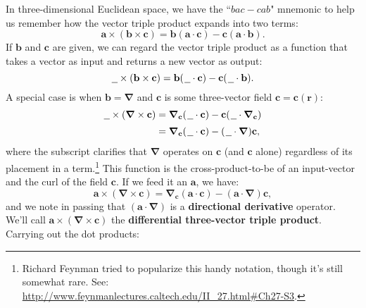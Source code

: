 \documentclass[12pt]{article}
\renewcommand{\vv}[1]{\mathbf{#1}}
\newcommand{\del}{\boldsymbol{\nabla}}
\begin{document}
In three-dimensional Euclidean space, we have the ``$bac - cab$" mnemonic to help us remember how the vector triple product expands into two terms:
\begin{equation*}
\vv a \times (\vv b \times \vv c) = \vv b (\vv a \cdot \vv c) - \vv c (\vv a \cdot \vv b).
\end{equation*}
If $\vv b$ and $\vv c$ are given, we can regard the vector triple product as a function that takes a vector as input and returns a new vector as output:
\begin{equation*}
\text{\underline{\hspace{.6em}}} \times (\vv b \times \vv c) = \vv b ( \mkern1.5mu \text{\underline{\hspace{.6em}}} \cdot \vv c ) - \vv c ( \mkern1.5mu \text{\underline{\hspace{.6em}}} \cdot \vv b ).
\end{equation*}
A special case is when $\vv b = \del$ and $\vv c$ is some three-vector field $\vv c = \vv c (\vv r)$:
\begin{equation}\label{eq:cc}
\begin{split}
\text{\underline{\hspace{.6em}}} \times (\del \times \vv c) &= \del_{\vv c} ( \mkern1.5mu \text{\underline{\hspace{.6em}}} \cdot \vv c ) - \vv c ( \mkern1.5mu \text{\underline{\hspace{.6em}}} \cdot \del_{\vv c} ) \\[2pt]
&= \del_{\vv c} ( \mkern1.5mu \text{\underline{\hspace{.6em}}} \cdot \vv c ) - ( \mkern1.5mu \text{\underline{\hspace{.6em}}} \cdot \del ) \vv c ,
\end{split}
\end{equation}
where the subscript clarifies that $\del$ operates on $\vv c$ (and $\vv c$ alone) regardless of its placement in a term.\footnote{\label{fn:fsn}Richard Feynman tried to popularize this handy notation, though it's still somewhat rare. See: \url{http://www.feynmanlectures.caltech.edu/II_27.html\#Ch27-S3}.} This function is the cross-product-to-be of an input-vector and the curl of the field $\vv c$. If we feed it an $\vv a$, we have:
\begin{equation*}
\vv a \times (\del \times \vv c) = \del_{\vv c} ( \vv a \cdot \vv c ) - ( \vv a \cdot \del ) \vv c ,
\end{equation*}
and we note in passing that $(\vv a \cdot \del)$ is a \textbf{directional derivative} operator. We'll call $\vv a \times (\del \times \vv c)$ the \textbf{differential three-vector triple product}. Carrying out the dot products:
\end{document}
